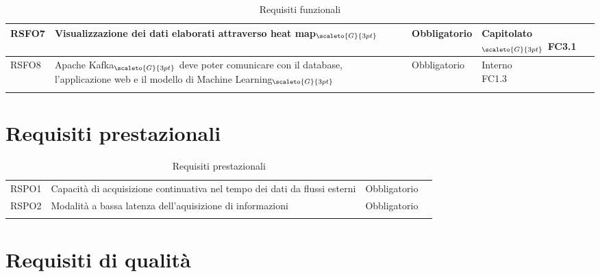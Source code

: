 {\begin{center}
\begin{longtable}{|p{3cm}|p{4cm}|p{4cm}|p{4cm}|}
			\hline
			\centering RSFO7 & Visualizzazione dei dati elaborati attraverso heat map$_{\scaleto{G}{3pt}}$ &\centering  Obbligatorio & \makecell[tc]{Capitolato$_{\scaleto{G}{3pt}}$ \\ FC3.1}  \\
			\hline
			\centering RSFO8 & Apache Kafka$_{\scaleto{G}{3pt}}$ deve poter comunicare con il database, l'applicazione web e il modello di Machine Learning$_{\scaleto{G}{3pt}}$  &\centering  Obbligatorio &  \makecell[tc]{Interno \\ FC1.3} 	\\
			\hline

			\rowcolor{white}

			\caption[Requisiti funzionali]{Requisiti funzionali}\label{4.1}\\
	\end{longtable}%

\end{center}

\section{Requisiti prestazionali}\label{RequisitiPrestazionali}
\def\tabularxcolumn#1{m{#1}}
{

	\begin{center}
		\renewcommand{\arraystretch}{1.4}
		\begin{longtable}{|p{4cm}|p{4cm}|p{4cm}|p{3cm}|}
		\hline
		\rowcolor{airforceblue}
		\makecell[c]{\textbf{Codice RS}} & \makecell[c]{\textbf{Descrizione}} & \makecell[c]{\textbf{Tipo di requisito}} & \makecell[c]{\textbf{Fonte}} \\
		\hline
		\centering RSPO1 & Capacità di acquisizione continuativa nel tempo dei dati da flussi esterni &\centering  Obbligatorio & \makecell[tc]{Capitolato$_{\scaleto{G}{3pt}}$}  \\
		\hline
		\centering RSPO2 & Modalità a bassa latenza dell'aquisizione di informazioni & \centering Obbligatorio & \makecell[tc]{Capitolato$_{\scaleto{G}{3pt}}$} \\
		\hline
		\rowcolor{white}

		\caption[Requisiti prestazionali]{Requisiti prestazionali}\label{4.2}\\
			\end{longtable}
	\end{center}
\section{Requisiti di qualità}\label{RequisitiDiQualita}
\def\tabularxcolumn#1{m{#1}}
{

}}}
